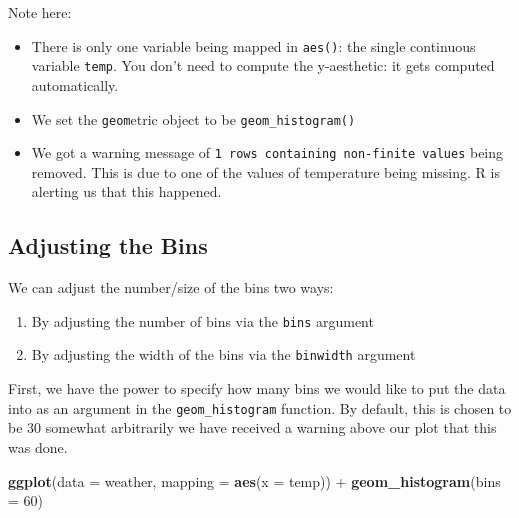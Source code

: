 \documentclass[]{tufte-book}
\newenvironment{Shaded}{\begin{snugshade}}{\end{snugshade}}
\newcommand{\KeywordTok}[1]{\textcolor[rgb]{0.13,0.29,0.53}{\textbf{{#1}}}}
\newcommand{\DataTypeTok}[1]{\textcolor[rgb]{0.13,0.29,0.53}{{#1}}}
\newcommand{\DecValTok}[1]{\textcolor[rgb]{0.00,0.00,0.81}{{#1}}}
\newcommand{\StringTok}[1]{\textcolor[rgb]{0.31,0.60,0.02}{{#1}}}
\newcommand{\NormalTok}[1]{{#1}}
\providecommand{\tightlist}{%
  \setlength{\itemsep}{0pt}\setlength{\parskip}{0pt}}
\begin{document}
Note here:

\begin{itemize}
\tightlist
\item
  There is only one variable being mapped in \texttt{aes()}: the single
  continuous variable \texttt{temp}. You don't need to compute the
  y-aesthetic: it gets computed automatically.
\item
  We set the \texttt{geom}etric object to be \texttt{geom\_histogram()}
\item
  We got a warning message of
  \texttt{1\ rows\ containing\ non-finite\ values} being removed. This
  is due to one of the values of temperature being missing. R is
  alerting us that this happened.
\end{itemize}

\subsection{Adjusting the Bins}\label{adjustbins}

We can adjust the number/size of the bins two ways:

\begin{enumerate}
\def\labelenumi{\arabic{enumi}.}
\tightlist
\item
  By adjusting the number of bins via the \texttt{bins} argument
\item
  By adjusting the width of the bins via the \texttt{binwidth} argument
\end{enumerate}

First, we have the power to specify how many bins we would like to put
the data into as an argument in the \texttt{geom\_histogram} function.
By default, this is chosen to be 30 somewhat arbitrarily we have
received a warning above our plot that this was done.

\begin{Shaded}
\begin{Highlighting}[]
\KeywordTok{ggplot}\NormalTok{(}\DataTypeTok{data =} \NormalTok{weather, }\DataTypeTok{mapping =} \KeywordTok{aes}\NormalTok{(}\DataTypeTok{x =} \NormalTok{temp)) +}
\StringTok{  }\KeywordTok{geom_histogram}\NormalTok{(}\DataTypeTok{bins =} \DecValTok{60}\NormalTok{)}
\end{Highlighting}
\end{Shaded}
\end{document}
